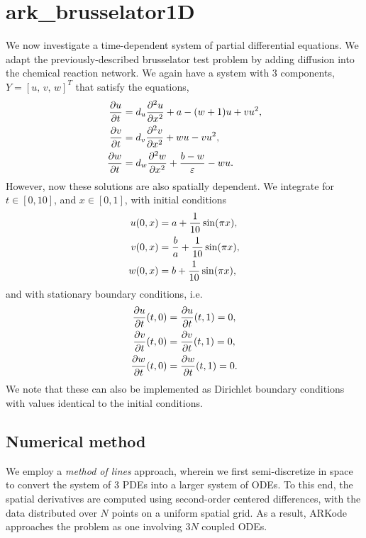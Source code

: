 \documentclass[letterpaper,10pt,english]{sphinxmanual}
\begin{document}
\section{ark\_brusselator1D}
\label{c_serial:ark-brusselator1d}\label{c_serial:id16}
We now investigate a time-dependent system of partial differential
equations.  We adapt the previously-described brusselator test problem
by adding diffusion into the chemical reaction network.  We again have
a system with 3 components, \(Y = [u,\, v,\, w]^T\) that satisfy
the equations,
\begin{gather}
\begin{split}\frac{\partial u}{\partial t} &= d_u \frac{\partial^2 u}{\partial
   x^2} + a - (w+1) u + v u^2, \\
\frac{\partial v}{\partial t} &= d_v \frac{\partial^2 v}{\partial
   x^2} + w u - v u^2, \\
\frac{\partial w}{\partial t} &= d_w \frac{\partial^2 w}{\partial
   x^2} + \frac{b-w}{\varepsilon} - w u.\end{split}\notag
\end{gather}
However, now these solutions are also spatially dependent.  We
integrate for \(t \in [0, 10]\), and \(x \in [0, 1]\), with
initial conditions
\begin{gather}
\begin{split}u(0,x) &=  a + \frac{1}{10} \sin(\pi x),\\
v(0,x) &= \frac{b}{a} + \frac{1}{10}\sin(\pi x),\\
w(0,x) &=  b + \frac{1}{10}\sin(\pi x),\end{split}\notag
\end{gather}
and with stationary boundary conditions, i.e.
\begin{gather}
\begin{split}\frac{\partial u}{\partial t}(t,0) &= \frac{\partial u}{\partial t}(t,1) = 0,\\
\frac{\partial v}{\partial t}(t,0) &= \frac{\partial v}{\partial t}(t,1) = 0,\\
\frac{\partial w}{\partial t}(t,0) &= \frac{\partial w}{\partial t}(t,1) = 0.\end{split}\notag
\end{gather}
We note that these can also be implemented as Dirichlet boundary
conditions with values identical to the initial conditions.


\subsection{Numerical method}
\label{c_serial:id17}
We employ a \emph{method of lines} approach, wherein we first
semi-discretize in space to convert the system of 3 PDEs into a larger
system of ODEs.  To this end, the spatial derivatives are computed
using second-order centered differences, with the data distributed
over \(N\) points on a uniform spatial grid.  As a result, ARKode
approaches the problem as one involving \(3N\) coupled ODEs.
\end{document}
